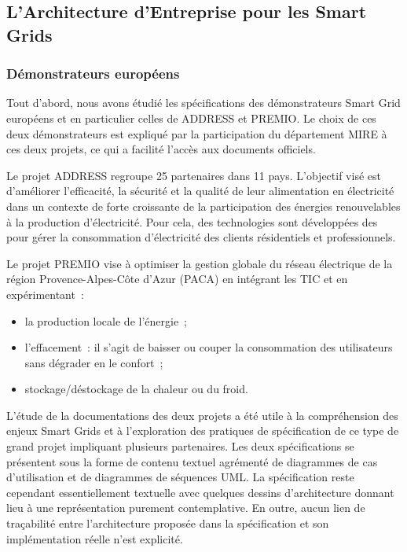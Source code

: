     \subsection{L'Architecture d'Entreprise pour les Smart Grids}
    \subsubsection{Démonstrateurs européens}
    \label{sec:DemonstrateursSG}

Tout d'abord, nous avons étudié les spécifications des démonstrateurs Smart Grid
européens et en particulier celles de ADDRESS et PREMIO. Le choix de ces deux
démonstrateurs est expliqué par la participation du département MIRE à ces deux
projets, ce qui a facilité l'accès aux documents officiels.



Le projet ADDRESS regroupe 25 partenaires dans 11 pays. L'objectif visé est
d'améliorer l'efficacité, la sécurité et la qualité de leur alimentation en
électricité dans un contexte de forte croissante de la participation des
énergies renouvelables à la production d'électricité. Pour cela, des
technologies sont développées des pour gérer la consommation d'électricité des
clients résidentiels et professionnels.

Le projet PREMIO vise à optimiser la gestion globale du réseau électrique de la
région Provence-Alpes-Côte d'Azur (PACA) en intégrant les TIC et en
expérimentant~:
\begin{itemize}
	\item la production locale de l'énergie~;
	\item l'effacement~: il s'agit de baisser ou couper la consommation des utilisateurs
sans dégrader en le confort~;
	\item stockage/déstockage de la chaleur ou du froid.
\end{itemize}

L'étude de la documentations des deux projets a été utile à la compréhension des
enjeux Smart Grids et à l'exploration des pratiques de spécification de ce type
de grand projet impliquant plusieurs partenaires. Les deux spécifications se
présentent sous la forme de contenu textuel agrémenté de diagrammes de cas
d'utilisation et de diagrammes de séquences UML. La spécification reste
cependant essentiellement textuelle avec quelques dessins d'architecture donnant
lieu à une représentation purement contemplative. En outre, aucun lien de
traçabilité entre l'architecture proposée dans la spécification et son
implémentation réelle n'est explicité.

